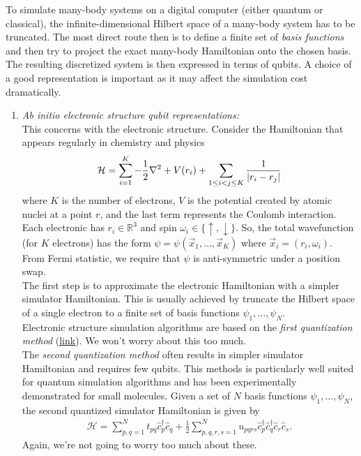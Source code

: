 \documentclass{book}
\theoremstyle{definition}
\newcommand{\had}{\mathcal{H}}
\newcommand{\f}[2]{\frac{#1}{#2}}
\begin{document}
To simulate many-body systems on a digital computer (either quantum or classical), the infinite-dimensional Hilbert space of a many-body system has to be truncated. The most direct route then is to define a finite set of \textit{basis functions} and then try to project the exact many-body Hamiltonian onto the chosen basis. The resulting discretized system is then expressed in terms of qubits. A choice of a good representation is important as it may affect the simulation cost dramatically. 


\begin{enumerate}
	\item \textit{Ab initio electronic structure qubit representations:}\\
	
	This concerns with the electronic structure. Consider the Hamiltonian that appears regularly in chemistry and physics
	\begin{align}
	\had = \sum^K_{i=1}-\f{1}{2}\laplacian + V(r_i) + \sum_{1\leq i<j\leq K}\f{1}{\abs{r_i - r_j}}
	\end{align}
	where $K$ is the number of electrons, $V$ is the potential created by atomic nuclei at a point $r$, and the last term represents the Coulomb interaction. Each electronic has $r_i \in \mathbb{R}^3$ and spin $\omega_i \in \{\uparrow, \downarrow\}$. So, the total wavefunction (for $K$ electrons) has the form $\psi = \psi(\vec{x}_1,\dots,\vec{x}_K)$ where $\vec{x}_i = (r_i,\omega_i)$. From Fermi statistic, we require that $\psi$ is anti-symmetric under a position swap.\\
	
	The first step is to approximate the electronic Hamiltonian with a simpler simulator Hamiltonian. This is usually achieved by truncate the Hilbert space of a single electron to a finite set of basis functions $\psi_1,\dots,\psi_N$. \\
	
	Electronic structure simulation algorithms are based on the \textit{first quantization method} (\href{https://journals.aps.org/prl/pdf/10.1103/PhysRevLett.79.2586}{\underline{link}}). We won't worry about this too much.\\
	
	The \textit{second quantization method} often results in simpler simulator Hamiltonian and requires few qubits. This methods is particularly well suited for quantum simulation algorithms and has been experimentally demonstrated for small molecules. Given a set of $N$ basis functions $\psi_1,\dots,\psi_N$, the second quantized simulator Hamiltonian is given by
	\begin{align}
	\had = \sum^N_{p,q=1} t_{pq}\hat{c}_p^\dagger \hat{c}_q + \f{1}{2}\sum^N_{p,q,r,s=1}u_{pqrs}\hat{c}^\dagger_p\hat{c}_q^\dagger \hat{c}_r \hat{c}_s.
	\end{align}
	Again, we're not going to worry too much about these. 
	

\end{enumerate}
\end{document}
